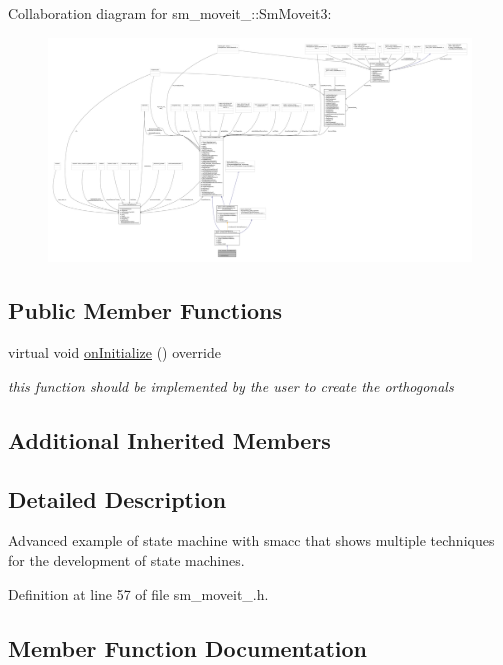 Collaboration diagram for sm\+\_\+moveit\+\_\+:\+:Sm\+Moveit3\+:
\nopagebreak
\begin{figure}[H]
\begin{center}
\leavevmode
\includegraphics[width=350pt]{structsm__moveit__3_1_1SmMoveit3__coll__graph}
\end{center}
\end{figure}
\subsection*{Public Member Functions}
\begin{DoxyCompactItemize}
\item 
virtual void \hyperlink{structsm__moveit__3_1_1SmMoveit3_afc1eae2ab78a27cd88d642b762501208}{on\+Initialize} () override
\begin{DoxyCompactList}\small\item\em this function should be implemented by the user to create the orthogonals \end{DoxyCompactList}\end{DoxyCompactItemize}
\subsection*{Additional Inherited Members}


\subsection{Detailed Description}
Advanced example of state machine with smacc that shows multiple techniques for the development of state machines. 

Definition at line 57 of file sm\+\_\+moveit\+\_.\+h.



\subsection{Member Function Documentation}
\mbox{\label{structsm__moveit__3_1_1SmMoveit3_afc1eae2ab78a27cd88d642b762501208}} 
